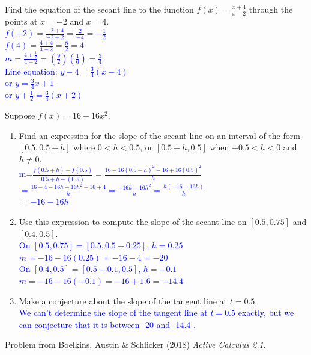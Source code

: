 \documentclass{ximera}
\begin{document}
\begin{exercise}
  Find the equation of the secant line to the function $f(x)=\frac{x+4}{x-2}$ through the points at $x=-2$ and $x=4$.\\
  \textcolor{blue}{ $f(-2)=\frac{-2+4}{-2-2}=\frac{2}{-4}=-\frac12$\\
    $f(4)=\frac{4+4}{4-2}=\frac{8}{2}=4$\\
    $m=\frac{4+\frac12}{4+2}=(\frac{9}{2})(\frac16)=\frac34$\\
    Line equation: $y-4=\frac34(x-4)$\\
    or $y=\frac34x+1$\\
    or $y+\frac12=\frac34(x+2)$}
\end{exercise}

\begin{exercise}
  Suppose $f(x)=16-16x^2$.
  \begin{enumerate}
    \item Find an expression for the slope of the secant line on an interval of the form $[0.5, 0.5+h]$ where $0<h<0.5$, or $[0.5+h,0.5]$ when $-0.5<h<0$ and $h\neq 0$.\\
    \textcolor{blue}{m=$\frac{f(0.5+h)-f(0.5)}{0.5+h-(0.5)}=\frac{16-16(0.5+h)^2-16+16(0.5)^2}{h}$
    $=\frac{16-4-16h-16h^2-16+4}{h}=\frac{-16h-16h^2}{h}=\frac{h(-16-16h)}{h}$\\
    $=-16-16h$}
    \item Use this expression to compute the slope of the secant line on $[0.5, 0.75]$ and $[0.4, 0.5]$.\\
    \textcolor{blue}{On $[0.5,0.75]=[0.5,0.5+0.25]$, $h=0.25$\\
    $m=-16-16(0.25)=-16-4=-20$ \\
    On $[0.4,0.5]=[0.5-0.1,0.5]$, $h=-0.1$\\
    $m=-16-16(-0.1)=-16+1.6=-14.4$}
    \item Make a conjecture about the slope of the tangent line at $t=0.5$. \\
    \textcolor{blue}{We can't determine the slope of the tangent line at $t=0.5$ exactly, but we can conjecture that it is between -20 and -14.4 .  }
  \end{enumerate}
  Problem from Boelkins, Austin \& Schlicker (2018) \textit{Active Calculus 2.1}.
\end{exercise}
\end{document}
